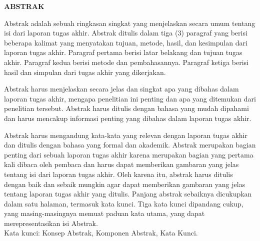 
\clearpage
{}
{}
\begin{center}
    \large{\textbf{ABSTRAK}}\\[1cm]
\end{center}

Abstrak adalah sebuah ringkasan singkat yang menjelaskan secara umum tentang isi dari laporan tugas akhir. Abstrak ditulis dalam tiga (3) paragraf yang berisi beberapa kalimat yang menyatakan tujuan, metode, hasil, dan kesimpulan dari laporan tugas akhir. Paragraf pertama berisi latar belakang dan tujuan tugas akhir. Paragraf kedua berisi metode dan pembahasannya. Paragraf ketiga berisi hasil dan simpulan dari tugas akhir yang dikerjakan.

Abstrak harus menjelaskan secara jelas dan singkat apa yang dibahas dalam laporan tugas akhir, mengapa penelitian ini penting dan apa yang ditemukan dari penelitian tersebut. Abstrak harus ditulis dengan bahasa yang mudah dipahami dan harus mencakup informasi penting yang dibahas dalam laporan tugas akhir. 

Abstrak harus mengandung kata-kata yang relevan dengan laporan tugas akhir dan ditulis dengan bahasa yang formal dan akademik. Abstrak merupakan bagian penting dari sebuah laporan tugas akhir karena merupakan bagian yang pertama kali dibaca oleh pembaca dan harus dapat memberikan gambaran yang jelas tentang isi dari laporan tugas akhir. Oleh karena itu, abstrak harus ditulis dengan baik dan sebaik mungkin agar dapat memberikan gambaran yang jelas tentang laporan tugas akhir yang ditulis. Panjang abstrak sebaiknya dicukupkan dalam satu halaman, termasuk kata kunci. Tiga kata kunci dipandang cukup, yang masing-masingnya memuat paduan kata utama, yang dapat merepresentasikan isi Abstrak.\\[0.6cm]

\noindent Kata kunci: Konsep Abstrak, Komponen Abstrak, Kata Kunci.

